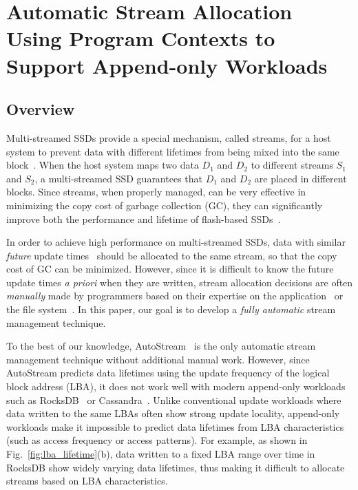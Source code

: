 \chapter{Automatic Stream Allocation Using Program Contexts to Support Append-only Workloads} 
\label{chap:PCstream_}
\section{Overview}

Multi-streamed SSDs provide a special mechanism,
called streams, for a host system to prevent data with different lifetimes 
from being mixed into the same block~\cite{T10, MultiStream}.
When the host system maps two data $D_1$ and $D_2$ to 
different streams $S_1$ and $S_2$, a multi-streamed SSD guarantees that 
$D_1$ and $D_2$ are placed in different blocks.   
Since streams, when properly managed, can be very effective in minimizing 
the copy cost of garbage collection (GC), they
can significantly improve both the performance and lifetime of 
flash-based SSDs~\cite{MultiStream, Level, FStream, AutoStream}.

In order to achieve high performance on multi-streamed SSDs, data with similar 
{\it future} update times~\cite{PCHa}
should be allocated 
to the same stream, so that the copy cost of GC can be minimized.
However, since it is difficult to know the future update times {\it a priori} when they are written,
stream allocation decisions are often {\it manually} made 
by programmers based on their expertise
on the application~\cite{MultiStream, Level} or the file system~\cite{FStream}.  
In this paper, our goal is to develop 
a {\it fully automatic} stream management technique. %

To the best of our knowledge, \textsf{\small AutoStream}~\cite{AutoStream} is the only automatic 
stream management technique
without additional manual work.  
However, since \textsf{\small AutoStream} predicts data lifetimes using the update frequency 
of the logical block address (LBA), it does not work well with modern append-only workloads 
such as RocksDB~\cite{RocksDB} or Cassandra~\cite{Cassandra}.  
Unlike conventional update workloads where data written to the same LBAs 
often show strong update locality, 
append-only workloads make it impossible to predict data lifetimes 
from LBA characteristics (such as access frequency or access patterns).  
For example, as shown in Fig.~\ref{fig:lba_lifetime}(b), 
data written to a fixed LBA range over time in RocksDB 
show widely varying data lifetimes, 
thus making it difficult to allocate streams based on LBA characteristics.

